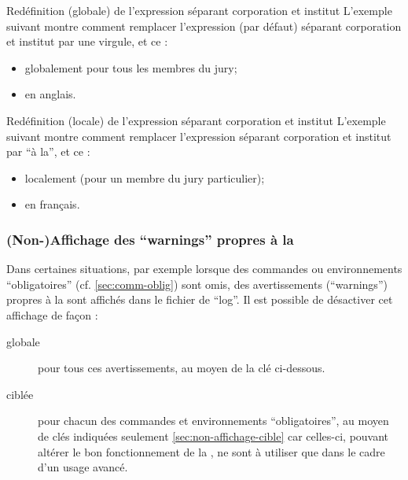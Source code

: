 \begin{dbexample}{Redéfinition (globale) de l'expression séparant corporation et
    institut}{}
  L'exemple suivant montre comment remplacer l'expression (par défaut) séparant
  corporation et institut par une virgule, et ce :
  \begin{itemize}
  \item globalement pour tous les membres du jury;
  \item en anglais.
  \end{itemize}
\end{dbexample}

\begin{dbexample}{Redéfinition (locale) de l'expression séparant corporation et
    institut}{}
  L'exemple suivant montre comment remplacer l'expression séparant corporation
  et institut par \enquote{\textvisiblespace{}à la\textvisiblespace{}}, et ce :
  \begin{itemize}
  \item localement (pour un membre du jury particulier);
  \item en français.
  \end{itemize}
\begin{bodycode}
\end{bodycode}
\end{dbexample}

\subsubsection{(Non-)Affichage des  \foreignquote{english}{warnings} propres à la \yatcl{}}
\label{sec:non-affichage-des}

Dans certaines situations, par exemple lorsque des commandes ou environnements
\enquote{obligatoires} (cf. \vref{sec:comm-oblig}) sont omis, des
avertissements (\foreignquote{english}{warnings}) propres à la \yatcl{} sont
affichés dans le fichier de \enquote{log}. Il est possible de désactiver cet
affichage de façon :
\begin{description}
\item[globale] pour tous ces avertissements, au moyen de la clé
   ci-dessous.
\item[ciblée] pour chacun des commandes et environnements
  \enquote{obligatoires}, au moyen de clés indiquées seulement
  \vref{sec:non-affichage-cible} car celles-ci, pouvant altérer le bon
  fonctionnement de la \yatcl{}, ne sont à utiliser que dans le cadre d'un
  usage avancé.
\end{description}

